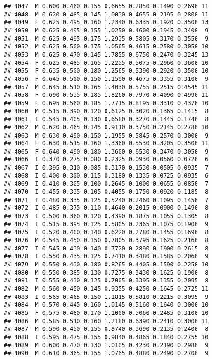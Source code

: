 \documentclass[
]{article}
\begin{document}
\begin{verbatim}
## 4047  M 0.600 0.460 0.155 0.6655 0.2850 0.1490 0.2690 11
## 4048  M 0.620 0.485 0.145 1.0030 0.4655 0.2195 0.2800 11
## 4049  F 0.625 0.495 0.160 1.2340 0.6335 0.1920 0.3500 13
## 4050  M 0.625 0.495 0.155 1.0250 0.4600 0.1945 0.3400  9
## 4051  M 0.625 0.495 0.175 1.2935 0.5805 0.3170 0.3550  9
## 4052  M 0.625 0.500 0.175 1.0565 0.4615 0.2580 0.3050 10
## 4053  M 0.625 0.470 0.145 1.7855 0.6750 0.2470 0.3245 13
## 4054  F 0.625 0.485 0.165 1.2255 0.5075 0.2960 0.3600 10
## 4055  F 0.635 0.500 0.180 1.2565 0.5390 0.2920 0.3500 10
## 4056  F 0.645 0.500 0.150 1.1590 0.4675 0.3355 0.3100  9
## 4057  M 0.645 0.510 0.165 1.4030 0.5755 0.2515 0.4545 11
## 4058  F 0.690 0.535 0.185 1.8260 0.7970 0.4090 0.4990 11
## 4059  F 0.695 0.560 0.185 1.7715 0.8195 0.3310 0.4370 10
## 4060  M 0.515 0.390 0.120 0.6125 0.3020 0.1365 0.1415  8
## 4061  I 0.545 0.405 0.130 0.6580 0.3270 0.1445 0.1740  8
## 4062  M 0.620 0.465 0.145 0.9110 0.3750 0.2145 0.2780 10
## 4063  M 0.630 0.490 0.150 1.1955 0.5845 0.2570 0.3000  9
## 4064  F 0.630 0.515 0.160 1.3360 0.5530 0.3205 0.3500 11
## 4065  F 0.640 0.490 0.180 1.3600 0.6530 0.3470 0.3050  9
## 4066  I 0.370 0.275 0.080 0.2325 0.0930 0.0560 0.0720  6
## 4067  I 0.395 0.310 0.085 0.3170 0.1530 0.0505 0.0935  7
## 4068  I 0.400 0.300 0.115 0.3180 0.1335 0.0725 0.0935  6
## 4069  I 0.410 0.305 0.100 0.2645 0.1000 0.0655 0.0850  7
## 4070  I 0.455 0.335 0.105 0.4055 0.1750 0.0920 0.1185  8
## 4071  I 0.480 0.335 0.125 0.5240 0.2460 0.1095 0.1450  7
## 4072  I 0.485 0.375 0.110 0.4640 0.2015 0.0900 0.1490  8
## 4073  I 0.500 0.360 0.120 0.4390 0.1875 0.1055 0.1305  8
## 4074  I 0.515 0.395 0.125 0.5805 0.2365 0.1075 0.1900  9
## 4075  I 0.520 0.400 0.140 0.6220 0.2780 0.1455 0.1690  8
## 4076  M 0.545 0.450 0.150 0.7805 0.3795 0.1625 0.2160  8
## 4077  I 0.545 0.430 0.140 0.7720 0.2890 0.1900 0.2615  8
## 4078  I 0.550 0.435 0.125 0.7410 0.3480 0.1585 0.2060  9
## 4079  M 0.550 0.430 0.180 0.8265 0.4405 0.1590 0.2250 10
## 4080  M 0.550 0.385 0.130 0.7275 0.3430 0.1625 0.1900  8
## 4081  I 0.555 0.430 0.125 0.7005 0.3395 0.1355 0.2095  8
## 4082  M 0.560 0.450 0.145 0.9355 0.4250 0.1645 0.2725 11
## 4083  I 0.565 0.465 0.150 1.1815 0.5810 0.2215 0.3095  9
## 4084  M 0.570 0.445 0.160 1.0145 0.5160 0.1640 0.3000 10
## 4085  F 0.575 0.480 0.170 1.1000 0.5060 0.2485 0.3100 10
## 4086  M 0.585 0.510 0.160 1.2180 0.6390 0.2410 0.3000 11
## 4087  M 0.590 0.450 0.155 0.8740 0.3690 0.2135 0.2400  8
## 4088  I 0.595 0.475 0.155 0.9840 0.4865 0.1840 0.2755 10
## 4089  M 0.600 0.470 0.130 1.0105 0.4230 0.2190 0.2980  9
## 4090  M 0.610 0.365 0.155 1.0765 0.4880 0.2490 0.2700  9

\end{verbatim}
\end{document}
